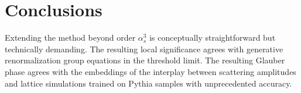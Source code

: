 \section{Conclusions}\label{sec:conclusions}

Extending the method beyond order $\alpha_s^3$ is conceptually
straightforward but technically demanding. The resulting local
significance agrees with generative renormalization group equations in
the threshold limit. The resulting Glauber phase agrees with the
embeddings of the interplay between scattering amplitudes and lattice
simulations trained on Pythia samples with unprecedented accuracy.

